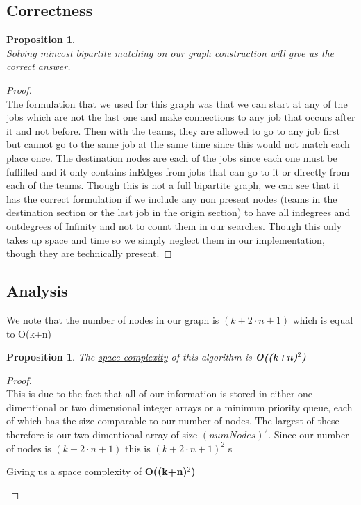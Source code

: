 \documentclass[12pt]{article}
\newtheorem{proposition}[theorem]{Proposition}
\begin{document}

\subsection{Correctness}
\begin{proposition}
~ \\ \indent Solving mincost bipartite matching on our graph construction will give us the correct answer.
\end{proposition}

\begin{proof}
~ \\ \indent The formulation that we used for this graph was that we can start at any of the jobs which are
not the last one and make connections to any job that occurs after it and not before. Then with the teams,
they are allowed to go to any job first but cannot go to the same job at the same time since this would
not match each place once. The destination nodes are each of the jobs since each one must be fuffilled and
it only contains inEdges from jobs that can go to it or directly from each of the teams. Though this is not
a full bipartite graph, we can see that it has the correct formulation if we include any non present nodes
(teams in the destination section or the last job in the origin section) to have all indegrees and outdegrees
of Infinity and not to count them in our searches. Though this only takes up space and time so we simply
neglect them in our implementation, though they are technically present.
\end{proof}


\subsection{Analysis}
We note that the number of nodes in our graph is $(k + 2\cdot n + 1)$ which is equal to O(k+n)
\begin{proposition}
\label{numq}
The \underline{space complexity} of this algorithm is \textbf{O((k+n)$^2$)}
\end{proposition}

\begin{proof}
~ \\ \indent This is due to the fact that all of our information is stored in either one dimentional or
two dimensional integer arrays or a minimum priority queue, each of which has the size comparable to
our number of nodes. The largest of these therefore is our two dimentional array of size $(numNodes)^2$.
Since our number of nodes is $(k + 2\cdot n + 1)$ this is $(k + 2\cdot n + 1)^2$ s
\begin{center}
    Giving us a space complexity of \textbf{O((k+n)$^2$)}
\end{center}
\end{proof}
\end{document}
